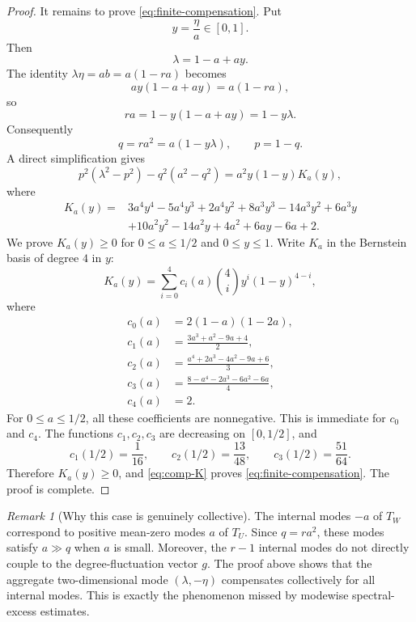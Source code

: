 \documentclass[11pt]{article}
\theoremstyle{definition}
\theoremstyle{remark}
\newtheorem{remark}[theorem]{Remark}
\newcommand{\0}{\mathbf 0}
\begin{document}
\begin{proof}
It remains to prove \eqref{eq:finite-compensation}.  Put
\[
        y=\frac{\eta}{a}\in[0,1].
\]
Then
\[
        \lambda=1-a+ay.
\]
The identity $\lambda\eta=ab=a(1-ra)$ becomes
\[
        ay(1-a+ay)=a(1-ra),
\]
so
\[
        ra=1-y(1-a+ay)=1-y\lambda.
\]
Consequently
\begin{equation}\label{eq:q-p-y}
        q=ra^2=a(1-y\lambda),
        \qquad
        p=1-q.
\end{equation}
A direct simplification gives
\begin{equation}\label{eq:comp-K}
        p^2(\lambda^2-p^2)-q^2(a^2-q^2)
        =a^2y(1-y)K_a(y),
\end{equation}
where
\begin{align*}
K_a(y)={}&
3a^4y^4-5a^4y^3+2a^4y^2
+8a^3y^3-14a^3y^2+6a^3y\\
&+10a^2y^2-14a^2y+4a^2+6ay-6a+2.
\end{align*}
We prove $K_a(y)\ge0$ for $0\le a\le1/2$ and $0\le y\le1$.  Write $K_a$ in the Bernstein basis of degree $4$ in $y$:
\[
        K_a(y)=\sum_{i=0}^4 c_i(a)\binom4i y^i(1-y)^{4-i},
\]
where
\begin{align*}
        c_0(a)&=2(1-a)(1-2a),\\
        c_1(a)&=\frac{3a^3+a^2-9a+4}{2},\\
        c_2(a)&=\frac{a^4+2a^3-4a^2-9a+6}{3},\\
        c_3(a)&=\frac{8-a^4-2a^3-6a^2-6a}{4},\\
        c_4(a)&=2.
\end{align*}
For $0\le a\le1/2$, all these coefficients are nonnegative.  This is immediate for $c_0$ and $c_4$.  The functions $c_1,c_2,c_3$ are decreasing on $[0,1/2]$, and
\[
        c_1(1/2)=\frac1{16},
        \qquad
        c_2(1/2)=\frac{13}{48},
        \qquad
        c_3(1/2)=\frac{51}{64}.
\]
Therefore $K_a(y)\ge0$, and \eqref{eq:comp-K} proves \eqref{eq:finite-compensation}.  The proof is complete.
\end{proof}

\begin{remark}[Why this case is genuinely collective]
The internal modes $-a$ of $T_W$ correspond to positive mean-zero modes $a$ of $T_U$.  Since $q=ra^2$, these modes satisfy $a\gg q$ when $a$ is small.  Moreover, the $r-1$ internal modes do not directly couple to the degree-fluctuation vector $g$.  The proof above shows that the aggregate two-dimensional mode $(\lambda,-\eta)$ compensates collectively for all internal modes.  This is exactly the phenomenon missed by modewise spectral-excess estimates.
\end{remark}
\end{document}
